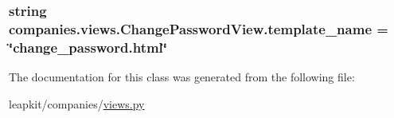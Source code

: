 \hypertarget{classcompanies_1_1views_1_1_change_password_view_ad461893cb0cb7754f7493bdd2ab9ee15}{
\subsubsection[{template\-\_\-name}]{\setlength{\rightskip}{0pt plus 5cm}string companies.\-views.\-Change\-Password\-View.\-template\-\_\-name = \char`\"{}change\-\_\-password.\-html\char`\"{}\hspace{0.3cm}{\ttfamily [static]}}}\label{classcompanies_1_1views_1_1_change_password_view_ad461893cb0cb7754f7493bdd2ab9ee15}


The documentation for this class was generated from the following file\-:\begin{DoxyCompactItemize}
\item 
leapkit/companies/\hyperlink{companies_2views_8py}{views.\-py}\end{DoxyCompactItemize}
